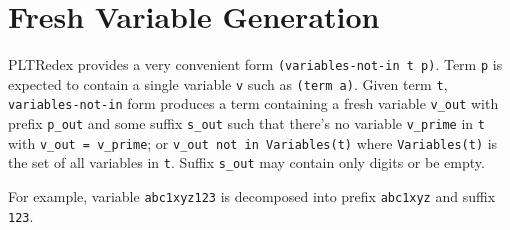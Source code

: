 \section{Fresh Variable Generation}
PLTRedex provides a very convenient form \texttt{(variables-not-in t p)}. Term \texttt{p} is expected to contain a single variable \texttt{v} such as \texttt{(term a)}. Given term \texttt{t}, \texttt{variables-not-in} form produces a term containing a fresh variable \texttt{v\_out} with prefix \texttt{p\_out} and some suffix \texttt{s\_out} such that there's no variable \texttt{v\_prime} in \texttt{t} with \texttt{v\_out = v\_prime}; or \texttt{v\_out not in Variables(t)} where \texttt{Variables(t)} is the set of all variables in \texttt{t}. Suffix \texttt{s\_out} may contain only digits or be empty. 

For example, variable \texttt{abc1xyz123} is decomposed into prefix \texttt{abc1xyz} and suffix \texttt{123}.

